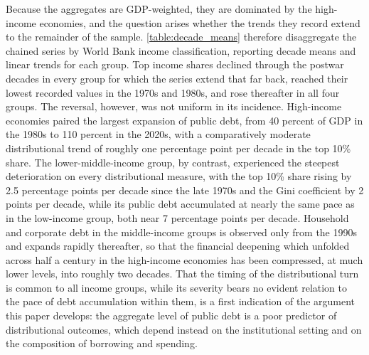 \documentclass[12pt, titlepage]{article}
\numberwithin{equation}{section}
\begin{document}
Because the aggregates are GDP-weighted, they are dominated by the
high-income economies, and the question arises whether the trends they record
extend to the remainder of the sample. \autoref{table:decade_means} therefore disaggregate the chained series by
World Bank income classification, reporting decade means and linear
trends for each group. Top income shares declined through the postwar decades in every group for which
the series extend that far back, reached their lowest recorded values in the
1970s and 1980s, and rose thereafter in all four groups. The reversal,
however, was not uniform in its incidence. High-income economies paired the
largest expansion of public debt, from 40 percent of GDP in the 1980s to 110
percent in the 2020s, with a comparatively moderate distributional trend of
roughly one percentage point per decade in the top 10\% share. The
lower-middle-income group, by contrast, experienced the steepest
deterioration on every distributional measure, with the top 10\% share rising
by 2.5 percentage points per decade since the late 1970s and the Gini
coefficient by 2 points per decade, while its public debt accumulated at
nearly the same pace as in the low-income group, both near 7 percentage
points per decade. Household and corporate debt in the middle-income groups
is observed only from the 1990s and expands rapidly thereafter, so that the
financial deepening which unfolded across half a century in the high-income
economies has been compressed, at much lower levels, into roughly two
decades. That the timing of the distributional turn is common to all income
groups, while its severity bears no evident relation to the pace of debt
accumulation within them, is a first indication of the argument this paper
develops: the aggregate level of public debt is a poor predictor of
distributional outcomes, which depend instead on the institutional setting
and on the composition of borrowing and spending.
\end{document}
